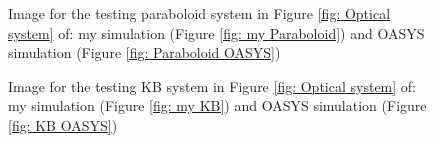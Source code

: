 \begin{figure}[H]
%
\centering
%
%
%
\caption{Image for the testing paraboloid system in Figure \ref{fig: Optical system} of: my simulation (Figure \ref{fig: my Paraboloid}) and OASYS simulation (Figure \ref{fig: Paraboloid OASYS})}
%
\label{fig: paraboloid OASYS}
%
\end{figure}
%
\begin{figure}[H]
%
%
%
\caption{Image for the testing KB system in Figure \ref{fig: Optical system} of: my simulation (Figure \ref{fig: my KB}) and OASYS simulation (Figure \ref{fig: KB OASYS})}
%
\label{fig: KB system OASYS}
%
\end{figure}
%
\newpage
%
